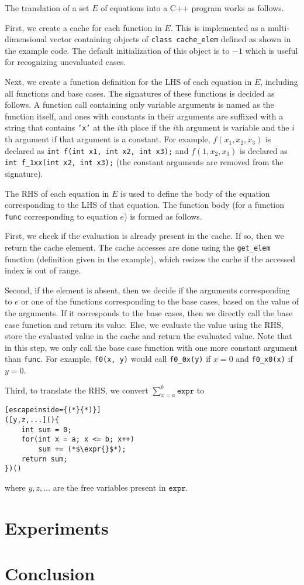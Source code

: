 \documentclass{article}
\newcommand{\expr}{\mathtt{expr}}
\begin{document}
The translation of a set $E$ of equations into a C++ program works as follows.

First, we create a cache for each function in $E$. This is implemented as a
multi-dimensional vector containing objects of \texttt{class cache\_elem}
defined as shown in the example code. The default initialization of this object
is to $-1$ which is useful for recognizing unevaluated cases.

Next, we create a function definition for the LHS of each equation in $E$,
including all functions and base cases. The signatures of these functions is
decided as follows. A function call containing only variable arguments is named
as the function itself, and ones with constants in their arguments are suffixed
with a string that contains \texttt{'x'} at the $i$th place if the $i$th
argument is variable and the $i$th argument if that argument is a constant. For
example, $f(x_{1}, x_{2}, x_{3})$ is declared as \texttt{int f(int x1, int x2,
  int x3);} and $f(1, x_{2}, x_{3})$ is declared as \texttt{int f\_1xx(int x2,
  int x3);} (the constant arguments are removed from the signature).

The RHS of each equation in $E$ is used to define the body of the equation
corresponding to the LHS of that equation. The function body (for a function
\texttt{func} corresponding to equation $e$) is formed as follows.

First, we check if the evaluation is already present in the cache. If so, then
we return the cache element. The cache accesses are done using the
\texttt{get\_elem} function (definition given in the example), which resizes the
cache if the accessed index is out of range.

Second, if the element is absent, then we decide if the arguments corresponding
to $e$ or one of the functions corresponding to the base cases, based on the
value of the arguments. If it corresponds to the base cases, then we directly
call the base case function and return its value. Else, we evaluate the value
using the RHS, store the evaluated value in the cache and return the evaluated
value. Note that in this step, we only call the base case function with one more
constant argument than \texttt{func}. For example, \texttt{f0(x, y)} would call
\texttt{f0\_0x(y)} if $x = 0$ and \texttt{f0\_x0(x)} if $y = 0$.

Third, to translate the RHS, we convert $\sum_{x=a}^{b} \expr{}$ to
\begin{lstlisting}[escapeinside={(*}{*)}]
([y,z,...](){
    int sum = 0;
    for(int x = a; x <= b; x++)
        sum += (*$\expr{}$*);
    return sum;
})()
\end{lstlisting}
where $y, z, \dots$ are the free variables present in $\expr{}$.

\section{Experiments}

\section{Conclusion}



\end{document}
